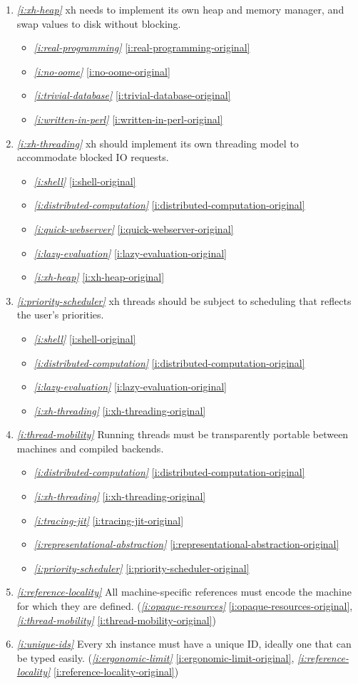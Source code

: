 \documentclass{report}
\makeatletter
\newcommand*{\Label}[2]{%
  \@bsphack
  \begingroup
    \label{#1-original}%
    \def\@currentlabel{#2}%
    \label{#1}%
  \endgroup
  \@esphack
}
\newcommand{\refboth}[1]{{\em \ref{#1}} \ref{#1-original}}
\makeatother
\begin{document}
\begin{enumerate}
\item{}\Label{i:xh-heap}{heap}{\em\ref{i:xh-heap}}
  xh needs to implement its own heap and memory manager, and swap values to
  disk without blocking.
\begin{itemize}
\item \refboth{i:real-programming}
\item \refboth{i:no-oome}
\item \refboth{i:trivial-database}
\item \refboth{i:written-in-perl}
\end{itemize}
\item{}\Label{i:xh-threading}{threading}{\em\ref{i:xh-threading}}
  xh should implement its own threading model to accommodate blocked IO
  requests.
\begin{itemize}
\item \refboth{i:shell}
\item \refboth{i:distributed-computation}
\item \refboth{i:quick-webserver}
\item \refboth{i:lazy-evaluation}
\item \refboth{i:xh-heap}
\end{itemize}
\item{}\Label{i:priority-scheduler}{threadscheduler}{\em\ref{i:priority-scheduler}}
  xh threads should be subject to scheduling that reflects the user's
  priorities.
\begin{itemize}
\item \refboth{i:shell}
\item \refboth{i:distributed-computation}
\item \refboth{i:lazy-evaluation}
\item \refboth{i:xh-threading}
\end{itemize}
\item{}\Label{i:thread-mobility}{threadmobility}{\em\ref{i:thread-mobility}}
  Running threads must be transparently portable between machines and
  compiled backends.
\begin{itemize}
\item \refboth{i:distributed-computation}
\item \refboth{i:xh-threading}
\item \refboth{i:tracing-jit}
\item \refboth{i:representational-abstraction}
\item \refboth{i:priority-scheduler}
\end{itemize}
\item{}\Label{i:reference-locality}{refaffinity}{\em\ref{i:reference-locality}}
  All machine-specific references must encode the machine for which they
  are defined.
(\refboth{i:opaque-resources}, \refboth{i:thread-mobility})
\item{}\Label{i:unique-ids}{uniqueid}{\em\ref{i:unique-ids}}
  Every xh instance must have a unique ID, ideally one that can be typed
  easily.
(\refboth{i:ergonomic-limit}, \refboth{i:reference-locality})


\end{enumerate}
\end{document}
